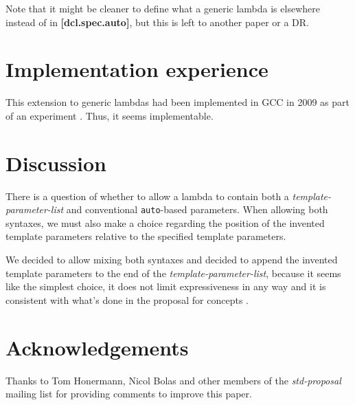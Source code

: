 \documentclass{wg21}
\newcommand{\cc}[1]{\texttt{#1}}
\begin{document}
Note that it might be cleaner to define what a generic lambda is elsewhere
instead of in \textbf{[dcl.spec.auto]}, but this is left to another paper
or a DR.


\section{Implementation experience}
This extension to generic lambdas had been implemented in GCC in 2009 as part
of an experiment \cite{GCC}. Thus, it seems implementable.


\section{Discussion} \label{discussion}
There is a question of whether to allow a lambda to contain both a
\textit{template-parameter-list} and conventional \cc{auto}-based parameters.
When allowing both syntaxes, we must also make a choice regarding the position
of the invented template parameters relative to the specified template parameters.

We decided to allow mixing both syntaxes and decided to append the invented
template parameters to the end of the \textit{template-parameter-list}, because
it seems like the simplest choice, it does not limit expressiveness in any way
and it is consistent with what's done in the proposal for concepts \cite{N4553}.


\section{Acknowledgements}
Thanks to Tom Honermann, Nicol Bolas and other members of the \textit{std-proposal}
mailing list for providing comments to improve this paper.
\end{document}
